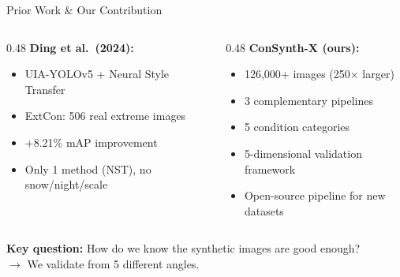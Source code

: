 \documentclass[aspectratio=169, 11pt]{beamer}
\begin{document}
\begin{frame}{Prior Work \& Our Contribution}

\begin{columns}[T]
\begin{column}{0.48\textwidth}
\textbf{Ding et al.\ (2024):}
\begin{itemize}\setlength\itemsep{0.1em}
    \item UIA-YOLOv5 + Neural Style Transfer
    \item ExtCon: 506 real extreme images
    \item +8.21\% mAP improvement
    \item Only 1 method (NST), no snow/night/scale
\end{itemize}
\end{column}
\begin{column}{0.48\textwidth}
\textbf{ConSynth-X (ours):}
\begin{itemize}\setlength\itemsep{0.1em}
    \item 126,000+ images (250$\times$ larger)
    \item 3 complementary pipelines
    \item 5 condition categories
    \item 5-dimensional validation framework
    \item Open-source pipeline for new datasets
\end{itemize}
\end{column}
\end{columns}

\vspace{0.8em}
\textbf{Key question:} How do we know the synthetic images are good enough?\\
$\to$ We validate from 5 different angles.
\end{frame}

\end{document}
